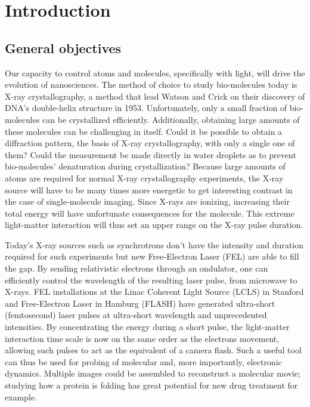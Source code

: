 \section{Introduction}


\subsection{General objectives}

Our capacity to control atoms and molecules, specifically with light,
will drive the evolution of nanosciences. The method of choice to study
bio-molecules today is X-ray crystallography, a method that lead Watson and
Crick on their discovery of DNA's double-helix structure in 1953.
Unfortunately, only a small fraction of bio-molecules can be crystallized
efficiently. Additionally, obtaining large amounts of these molecules can be
challenging in itself. Could it be possible to obtain a diffraction pattern,
the basis of X-ray crystallography, with only a single one of them? Could the
measurement be made directly in water droplets as to prevent bio-molecules'
denaturation during crystallization? Because large amounts of atoms are
required for normal X-ray crystallography experiments, the X-ray source will
have to be many times more energetic to get interesting contrast in the
case of single-molecule imaging. Since X-rays are ionizing, increasing their
total energy will have unfortunate consequences for the molecule. This
extreme light-matter interaction will thus set an upper range on the X-ray
pulse duration.

Today's X-ray sources such as synchrotrons don't have the intensity and
duration required for such experiments but new Free-Electron Laser (FEL) are
able to fill the gap. By sending relativistic electrons through an ondulator,
one can efficiently control the wavelength of the resulting laser pulse, from
microwave to X-rays. FEL installations at the Linac Coherent Light Source
(LCLS) in Stanford and Free-Electron Laser in Hamburg (FLASH) have generated
ultra-short (femtosecond) laser pulses at ultra-short wavelength and
unprecedented intensities. By concentrating the energy during a short pulse,
the light-matter interaction time scale is now on the same order as the
electrons movement, allowing such pulses to act as the equivalent of a camera
flash. Such a useful tool can thus be used for probing of molecular
and, more importantly, electronic dynamics. Multiple images could be assembled
to reconstruct a molecular movie; studying how a protein is folding has great
potential for new drug treatment for example.

